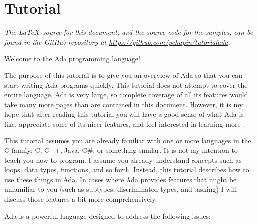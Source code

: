 
\chapter{Tutorial}
\label{chapt:tutorial}

\textit{The \LaTeX\ source for this document, and the source code for the samples, can be found
in the GitHub repository at \url{https://github.com/pchapin/tutorialada}.}

Welcome to the Ada programming language!

The purpose of this tutorial is to give you an overview of Ada so that you can start writing Ada
programs quickly. This tutorial does not attempt to cover the entire language. Ada is very
large, so complete coverage of all its features would take many more pages than are contained in
this document. However, it is my hope that after reading this tutorial you will have a good
sense of what Ada is like, appreciate some of its nicer features, and feel interested in
learning more \cite{Barnes2014,McCormick2011,Ben-Ari2009,Burns2007,Dale2007}.

This tutorial assumes you are already familiar with one or more languages in the C family: C,
C++, Java, C\#, or something similar. It is not my intention to teach you how to program. I
assume you already understand concepts such as loops, data types, functions, and so forth.
Instead, this tutorial describes how to use these things in Ada. In cases where Ada provides
features that might be unfamiliar to you (such as subtypes, discriminated types, and tasking) I
will discuss those features a bit more comprehensively.

Ada is a powerful language designed to address the following issues:

